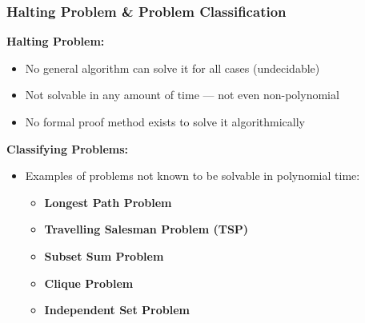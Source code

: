 
\begin{frame}
  \frametitle{Halting Problem \& Problem Classification}
  
  \textbf{Halting Problem:}
  \begin{itemize}
      \item No general algorithm can solve it for all cases (undecidable)
      \vspace{3pt}
      \item Not solvable in any amount of time — not even non-polynomial
      \vspace{3pt}
      \item No formal proof method exists to solve it algorithmically
  \end{itemize}
  
  \vspace{0.5cm}
  
  \textbf{Classifying Problems:}
  \begin{itemize}
      \vspace{5pt}
      \item Examples of problems not known to be solvable in polynomial time:
      \begin{itemize}
          \item \textbf{Longest Path Problem}
          \vspace{3pt}
          \item \textbf{Travelling Salesman Problem (TSP)}
          \vspace{3pt}
          \item \textbf{Subset Sum Problem}
          \vspace{3pt}
          \item \textbf{Clique Problem}
          \vspace{3pt}
          \item \textbf{Independent Set Problem}
      \end{itemize}
  \end{itemize}
\end{frame}



